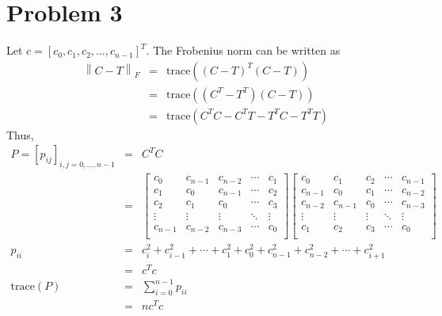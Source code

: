 \documentclass[11pt]{article}
\newcommand{\norm}[1]{\left\lVert#1\right\rVert}
\theoremstyle{definition}
\theoremstyle{remark}
\theoremstyle{plain}
\begin{document}
\section*{Problem 3}
Let $c=\left[c_0,c_1,c_2,\dots,c_{n-1}\right]^T$.
The Frobenius norm can be written as
\begin{eqnarray*}
  \norm{C-T}_F&=&\textrm{trace}\left(\left(C-T\right)^T\left(C-T\right)\right)\\
              &=&\textrm{trace}\left(\left(C^T-T^T\right)\left(C-T\right)\right)\\
              &=&\textrm{trace}\left(C^TC-C^TT-T^TC-T^TT\right)
\end{eqnarray*}
Thus,
\begin{eqnarray*}
  P=\left[p_{ij}\right]_{i,j=0,\dots,n-1}&=&C^TC\\
                              &=&\left[
                                  \begin{array}{ccccc}
                                    c_0&c_{n-1}&c_{n-2}&\cdots&c_1\\
                                    c_1&c_0&c_{n-1}&\cdots&c_2\\
                                    c_2&c_1&c_0&\cdots&c_3\\
                                    \vdots&\vdots&\vdots&\ddots&\vdots\\
                                    c_{n-1}&c_{n-2}&c_{n-3}&\cdots&c_0\\
                                  \end{array}
  \right]\left[
  \begin{array}{ccccc}
    c_0&c_1&c_2&\cdots&c_{n-1}\\
    c_{n-1}&c_0&c_1&\cdots&c_{n-2}\\
    c_{n-2}&c_{n-1}&c_0&\cdots&c_{n-3}\\
    \vdots&\vdots&\vdots&\ddots&\vdots\\
    c_1&c_2&c_3&\cdots&c_0\\
  \end{array}
  \right]\\
  p_{ii}&=&c_i^2+c_{i-1}^2+\cdots+c_1^2+c_0^2+c_{n-1}^2+c_{n-2}^2+\cdots+c_{i+1}^2\\
                              &=&c^Tc\\
  \textrm{trace}\left(P\right)&=&\sum_{i=0}^{n-1}p_{ii}\\
                              &=&nc^Tc
\end{eqnarray*}
\end{document}

